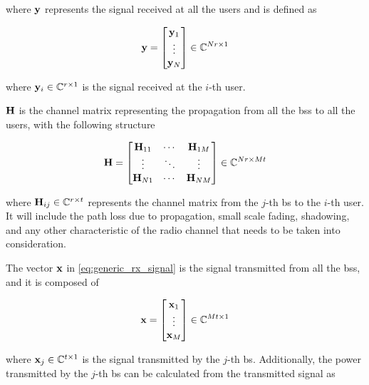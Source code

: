 \noindent
where $\mathbf{y}$ represents the signal received at all the users and is defined as

\begin{equation} \label{eq:generic_rx_signal}
    \mathbf{y} = \begin{bmatrix}
            \mathbf{y}_1\\
            \vdots\\
            \mathbf{y}_N
        \end{bmatrix} \in \mathbb{C}^{Nr \times 1}
\end{equation}

\noindent
where $\mathbf{y}_i \in \mathbb{C}^{r \times 1}$ is the signal received at the $i$-th user.

$\mathbf{H}$ is the channel matrix representing the propagation from all the \glspl{bs}
to all the users, with the following structure

\begin{equation} \label{eq:generic_ch_mat}
    \mathbf{H} = \begin{bmatrix}
            \mathbf{H}_{11} & \cdots & \mathbf{H}_{1M}\\
            \vdots   & \ddots & \vdots\\
            \mathbf{H}_{N1}  & \cdots & \mathbf{H}_{NM}
    \end{bmatrix} \in \mathbb{C}^{Nr \times Mt}
\end{equation}

\noindent
where $\mathbf{H}_{ij} \in \mathbb{C}^{r \times t}$ represents the channel matrix from the
$j$-th \gls{bs} to the $i$-th user. It will include the path loss due to
propagation, small scale fading, shadowing, and any other characteristic of
the radio channel that needs to be taken into consideration.

The vector $\mathbf{x}$ in \eqref{eq:generic_rx_signal} is the signal transmitted from
all the \glspl{bs}, and it is composed of

\begin{equation} \label{eq:generic_tx_signal}
    \mathbf{x} = \begin{bmatrix}
        \mathbf{x}_1 \\
        \vdots \\
        \mathbf{x}_M
    \end{bmatrix} \in \mathbb{C}^{Mt \times 1}
\end{equation}

\noindent
where $\mathbf{x}_j \in \mathbb{C}^{t \times 1}$ is the signal transmitted by the $j$-th
\gls{bs}. Additionally, the power transmitted by the $j$-th \gls{bs} can be
calculated from the transmitted signal as

